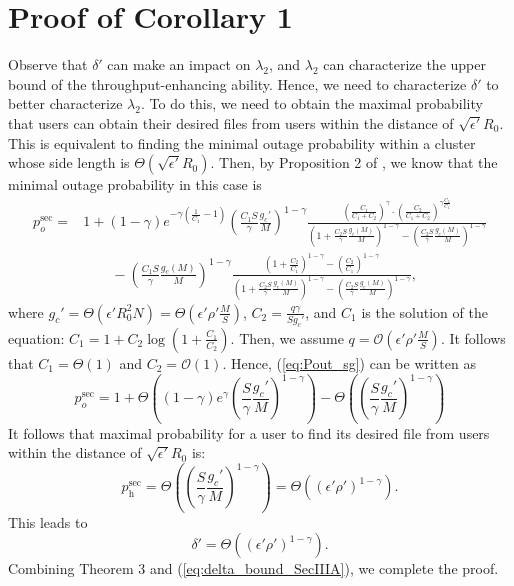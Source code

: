 \documentclass[journal,draftclsnofoot,onecolumn,12pt,twoside]{IEEEtran}
\begin{document}
\section{Proof of Corollary 1}

\label{App:ProofCoro1}

Observe that $\delta'$ can make an impact on $\lambda_2$, and $\lambda_2$ can characterize the upper bound of the throughput-enhancing ability. Hence, we need to characterize $\delta'$ to better characterize $\lambda_2$. To do this, we need to obtain the maximal probability that users can obtain their desired files from users within the distance of $\sqrt{\epsilon'} R_0$. This is equivalent to finding the minimal outage probability within a cluster whose side length is $\Theta\left(\sqrt{\epsilon'} R_0\right)$. Then, by Proposition 2 of \cite{lee2020optimal}, we know that the minimal outage probability in this case is
\begin{equation}
\begin{aligned}\label{eq:Pout_sg}
p_o^{\text{sec}}= &1+(1-\gamma)e^{-\gamma\left(\frac{1}{C_1}-1\right)}\left(\frac{C_1S}{\gamma}\frac{g_c'}{M}\right)^{1-\gamma}\frac{\left(\frac{C_1}{C_1+C_2}\right)^{\gamma}\cdot\left(\frac{C_2}{C_1+C_2}\right)^{\gamma\frac{ C_2}{C_1}}}{\left(1+\frac{C_2S}{\gamma}\frac{g_c(M)}{M}\right)^{1-\gamma}-\left(\frac{C_2S}{\gamma}\frac{g_c(M)}{M}\right)^{1-\gamma}}\\
&\qquad - \left(\frac{C_1S}{\gamma}\frac{g_c(M)}{M}\right)^{1-\gamma}\frac{\left(1+\frac{C_2}{C_1}\right)^{1-\gamma}-\left(\frac{C_2}{C_1}\right)^{1-\gamma}}{\left(1+\frac{C_2S}{\gamma}\frac{g_c(M)}{M}\right)^{1-\gamma}-\left(\frac{C_2S}{\gamma}\frac{g_c(M)}{M}\right)^{1-\gamma}},
\end{aligned}
\end{equation} 
where $g_c'=\Theta\left(\epsilon'R_0^2N\right)=\Theta\left(\epsilon'\rho'\frac{M}{S}\right)$, $C_2=\frac{q\gamma}{Sg_c'}$, and $C_1$ is the solution of the equation: $C_1=1+C_2\log\left(1+\frac{C_1}{C_2}\right)$. Then, we assume $q=\mathcal{O}\left(\epsilon'\rho'\frac{M}{S}\right)$. It follows that $C_1=\Theta(1)$ and $C_2=\mathcal{O}(1)$. Hence, (\ref{eq:Pout_sg}) can be written as
\begin{equation}
p_o^{\text{sec}}=1+\Theta\left((1-\gamma)e^{\gamma}\left(\frac{S}{\gamma}\frac{g_c'}{M}\right)^{1-\gamma}\right)-\Theta\left(\left(\frac{S}{\gamma}\frac{g_c'}{M}\right)^{1-\gamma}\right)
\end{equation}
It follows that maximal probability for a user to find its desired file from users within the  distance of $\sqrt{\epsilon'}R_0$ is:
\begin{equation}\label{eq:Phit_2_SecIIIA}
p_{\text{h}}^{\text{sec}}=\Theta\left(\left(\frac{S}{\gamma}\frac{g_c'}{M}\right)^{1-\gamma}\right)=\Theta((\epsilon'\rho')^{1-\gamma}).
\end{equation}
This leads to
\begin{equation}\label{eq:delta_bound_SecIIIA}
\delta'=\Theta\left((\epsilon'\rho')^{1-\gamma}\right).
\end{equation}
Combining Theorem 3 and (\ref{eq:delta_bound_SecIIIA}), we complete the proof.
\end{document}
